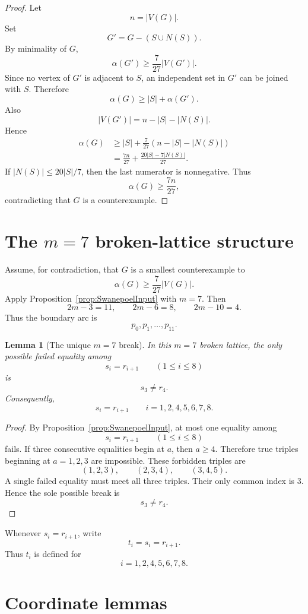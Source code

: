 \documentclass[11pt]{article}
\newtheorem{lemma}[theorem]{Lemma}
\begin{document}
\begin{proof}
Let
\[
 n=|V(G)|.
\]
Set
\[
 G'=G-(S\cup N(S)).
\]
By minimality of $G$,
\[
 \alpha(G')\ge \frac{7}{27}|V(G')|.
\]
Since no vertex of $G'$ is adjacent to $S$, an independent set in $G'$ can be joined with $S$. Therefore
\[
 \alpha(G)\ge |S|+\alpha(G').
\]
Also
\[
 |V(G')|=n-|S|-|N(S)|.
\]
Hence
\[
\begin{aligned}
 \alpha(G)
 &\ge |S|+\frac{7}{27}(n-|S|-|N(S)|)\\
 &=\frac{7n}{27}+\frac{20|S|-7|N(S)|}{27}.
\end{aligned}
\]
If $|N(S)|\le 20|S|/7$, then the last numerator is nonnegative. Thus
\[
 \alpha(G)\ge \frac{7n}{27},
\]
contradicting that $G$ is a counterexample.
\end{proof}

\section{The $m=7$ broken-lattice structure}

Assume, for contradiction, that $G$ is a smallest counterexample to
\[
 \alpha(G)\ge \frac{7}{27}|V(G)|.
\]
Apply Proposition~\ref{prop:SwanepoelInput} with $m=7$. Then
\[
 2m-3=11,
 \qquad
 2m-6=8,
 \qquad
 2m-10=4.
\]
Thus the boundary arc is
\[
 p_0,p_1,\ldots,p_{11}.
\]

\begin{lemma}[The unique $m=7$ break]\label{lem:unique-break}
In this $m=7$ broken lattice, the only possible failed equality among
\[
 s_i=r_{i+1}\qquad(1\le i\le 8)
\]
is
\[
 s_3\ne r_4.
\]
Consequently,
\[
 s_i=r_{i+1}\qquad i=1,2,4,5,6,7,8.
\]
\end{lemma}

\begin{proof}
By Proposition~\ref{prop:SwanepoelInput}, at most one equality among
\[
 s_i=r_{i+1}\qquad(1\le i\le 8)
\]
fails. If three consecutive equalities begin at $a$, then $a\ge4$.
Therefore true triples beginning at $a=1,2,3$ are impossible. These forbidden triples are
\[
 (1,2,3),\qquad (2,3,4),\qquad (3,4,5).
\]
A single failed equality must meet all three triples. Their only common index is $3$. Hence the sole possible break is
\[
 s_3\ne r_4.
\]
\end{proof}

Whenever $s_i=r_{i+1}$, write
\[
 t_i=s_i=r_{i+1}.
\]
Thus $t_i$ is defined for
\[
 i=1,2,4,5,6,7,8.
\]

\section{Coordinate lemmas}
\end{document}
